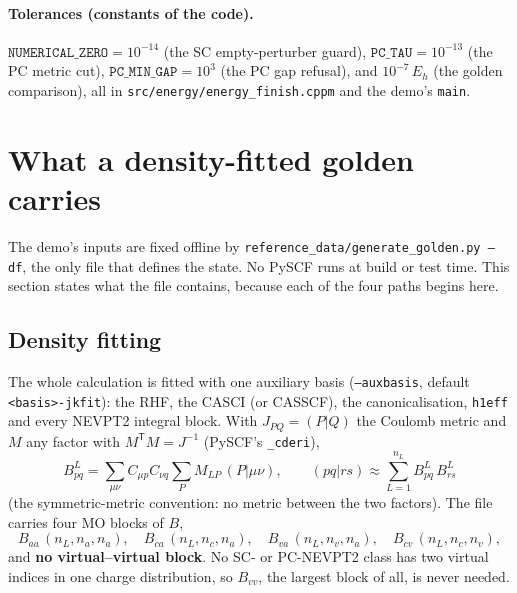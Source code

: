 \documentclass[11pt]{article}
\newcommand{\code}[1]{\texttt{#1}}
\begin{document}
\paragraph{Tolerances (constants of the code).}
$\code{NUMERICAL\_ZERO} = 10^{-14}$ (the SC empty-perturber guard),
$\code{PC\_TAU} = 10^{-13}$ (the PC metric cut),
$\code{PC\_MIN\_GAP} = 10^{3}$ (the PC gap refusal), and $10^{-7}\,E_h$ (the
golden comparison), all in \code{src/energy/energy\_finish.cppm} and the
demo's \code{main}.

\section{What a density-fitted golden carries}
\label{sec:input}

The demo's inputs are fixed offline by \code{reference\_data/generate\_golden.py
--df}, the only file that defines the state. No PySCF runs at build or test
time. This section states what the file contains, because each of the four
paths begins here.

\subsection{Density fitting}
The whole calculation is fitted with one auxiliary basis (\code{--auxbasis},
default \code{<basis>-jkfit}): the RHF, the CASCI (or CASSCF), the
canonicalisation, \code{h1eff} and every NEVPT2 integral block. With $J_{PQ} =
(P|Q)$ the Coulomb metric and $M$ any factor with $M^{\mathsf T}M = J^{-1}$
(PySCF's \code{\_cderi}),
\begin{equation}
  B^L_{pq} = \sum_{\mu\nu} C_{\mu p} C_{\nu q} \sum_P M_{LP}\,(P|\mu\nu),
  \qquad
  (pq|rs) \approx \sum_{L=1}^{n_L} B^L_{pq}\,B^L_{rs}
  \label{eq:df}
\end{equation}
(the symmetric-metric convention: no metric between the two factors). The file
carries four MO blocks of $B$,
\begin{equation}
  B_{aa}\,(n_L,n_a,n_a),\quad B_{ca}\,(n_L,n_c,n_a),\quad
  B_{va}\,(n_L,n_v,n_a),\quad B_{cv}\,(n_L,n_c,n_v),
  \label{eq:bblocks}
\end{equation}
and \textbf{no virtual--virtual block}. No SC- or PC-NEVPT2 class has two
virtual indices in one charge distribution, so $B_{vv}$, the largest block of
all, is never needed.
\end{document}
